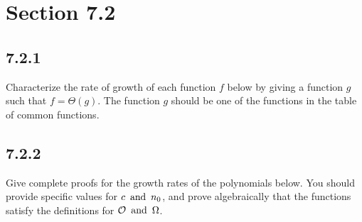 





\section*{Section 7.2}

\subsection*{7.2.1}
Characterize the rate of growth of each function $f$ below by giving a function $g$ such that $f = \Theta(g)$. The function $g$ should be one of the functions in the table of common functions.
\begin{enumerate}
\end{enumerate}

\subsection*{7.2.2}
Give complete proofs for the growth rates of the polynomials below. You should provide specific values for $c \operatorname{~\text{and}~} n_0$, and prove algebraically that the functions satisfy the definitions for $\mathcal{O} \operatorname{~\text{and}~} \Omega$.
\begin{enumerate}
\end{enumerate}

